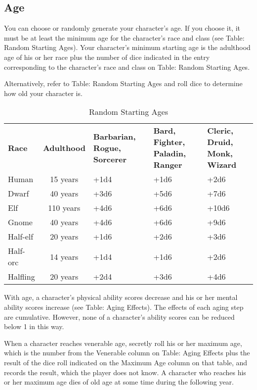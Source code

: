 \subsection{Age}

You can choose or randomly generate your character's age. If you choose it, it 
must be at least the minimum age for the character's race and class (see Table: 
Random Starting Ages). Your character's minimum starting age is the adulthood age 
of his or her race plus the number of dice indicated in the entry corresponding 
to the character's race and class on Table: Random Starting Ages.

Alternatively, refer to Table: Random Starting Ages and roll dice to determine 
how old your character is.

\begin{table}[htb]
\caption{Random Starting Ages}
\centering
\begin{tabular}{l c p{2.5cm} p{2.5cm} p{2.2cm}}
\textbf{Race}  &  \textbf{Adulthood}  &  \textbf{Barbarian, Rogue, Sorcerer}  &  \textbf{Bard, Fighter, Paladin, Ranger}  &  {\raggedright{}\textbf{Cleric, Druid, Monk, Wizard}}\\
Human & 15 years & +1d4 & +1d6 & +2d6\\
Dwarf & 40 years & +3d6 & +5d6 & +7d6\\
Elf & 110 years & +4d6 & +6d6 & +10d6\\
Gnome & 40 years & +4d6 & +6d6 & +9d6\\
Half-elf & 20 years & +1d6 & +2d6 & +3d6\\
Half-orc & 14 years & +1d4 & +1d6 & +2d6\\
Halfling & 20 years & +2d4 & +3d6 & +4d6\\
\end{tabular}
\end{table}

With age, a character's physical ability scores decrease and his or her mental 
ability scores increase (see Table: Aging Effects). The effects of each aging step 
are cumulative. However, none of a character's ability scores can be reduced below 
1 in this way.

When a character reaches venerable age, secretly roll his or her maximum age, which 
is the number from the Venerable column on Table: Aging Effects plus the result 
of the dice roll indicated on the Maximum Age column on that table, and records 
the result, which the player does not know. A character who reaches his or her 
maximum age dies of old age at some time during the following year.

